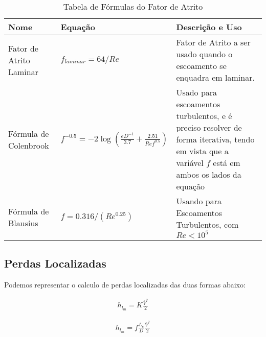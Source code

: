 \documentclass{article}
\begin{document}
\begin{table}[h]
    \begin{tabularx}{\textwidth}{|X|X|X|}\hline
        \textbf{Nome}           & \textbf{Equação}                                                               & \textbf{Descrição e Uso}                                                                                                                         \\ \hline
        Fator de Atrito Laminar & $f_{laminar} = 64/Re$                                                          & Fator de Atrito a ser usado quando o escoamento se enquadra em laminar.                                                                          \\ \hline
        Fórmula de Colenbrook   & $f^{-0.5} = -2 \log\left(\frac{eD^{-1}}{3.7} + \frac{2.51}{Re f^{0.5}}\right)$ & Usado para escoamentos turbulentos, e é preciso resolver de forma iterativa, tendo em vista que a variável $f$ está em ambos os lados da equação \\ \hline
        Fórmula de Blausius     & $f = 0.316/(Re^{0.25})$                                                        & Usando para Escoamentos Turbulentos, com $Re<10^5$                                                                                               \\ \hline
    \end{tabularx}
    \caption{Tabela de Fórmulas do Fator de Atrito}
    \label{tab:fator_atrito}
\end{table}

\subsection{Perdas Localizadas}
Podemos representar o calculo de perdas localizadas das duas formas abaixo:

\begin{minipage}{.4\textwidth}
    \begin{align}
        h_{l_m} = K \frac{\bar{V}^2}{2}
        \label{eq:perda_carga_local_forma_1}
    \end{align}
\end{minipage}
\begin{minipage}{.5\textwidth}
    \begin{align}
        h_{l_m} = f \frac{L_e}{D} \frac{\bar{V}^2}{2}
        \label{eq:perda_carga_local_forma_2}
    \end{align}
\end{minipage}
\end{document}
